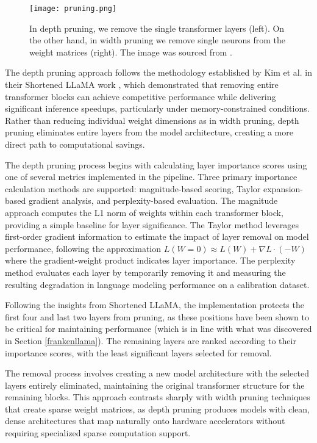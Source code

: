 \begin{figure}[htbp]
    \centering
    \texttt{[image: pruning.png]}
    \caption[Comparison of Depth and Width Pruning]{In depth pruning, we remove the single transformer layers (left). On the other hand, in width pruning we remove single neurons from the weight matrices (right). The image was sourced from \cite{shortened_llama}.}
    \label{fig:pruning_comparison}
\end{figure}

The depth pruning approach follows the methodology established by Kim et al. in their Shortened LLaMA work \cite{shortened_llama}, which demonstrated that removing entire transformer blocks can achieve competitive performance while delivering significant inference speedups, particularly under memory-constrained conditions. Rather than reducing individual weight dimensions as in width pruning, depth pruning eliminates entire layers from the model architecture, creating a more direct path to computational savings.

The depth pruning process begins with calculating layer importance scores using one of several metrics implemented in the pipeline. Three primary importance calculation methods are supported: magnitude-based scoring, Taylor expansion-based gradient analysis, and perplexity-based evaluation. The magnitude approach computes the L1 norm of weights within each transformer block, providing a simple baseline for layer significance. The Taylor method leverages first-order gradient information to estimate the impact of layer removal on model performance, following the approximation $L(W = 0) \approx L(W) + \nabla L \cdot (-W)$ where the gradient-weight product indicates layer importance. The perplexity method evaluates each layer by temporarily removing it and measuring the resulting degradation in language modeling performance on a calibration dataset.

Following the insights from Shortened LLaMA, the implementation protects the first four and last two layers from pruning, as these positions have been shown to be critical for maintaining performance (which is in line with what was discovered in Section \ref{frankenllama}). The remaining layers are ranked according to their importance scores, with the least significant layers selected for removal.

The removal process involves creating a new model architecture with the selected layers entirely eliminated, maintaining the original transformer structure for the remaining blocks. This approach contrasts sharply with width pruning techniques that create sparse weight matrices, as depth pruning produces models with clean, dense architectures that map naturally onto hardware accelerators without requiring specialized sparse computation support.


